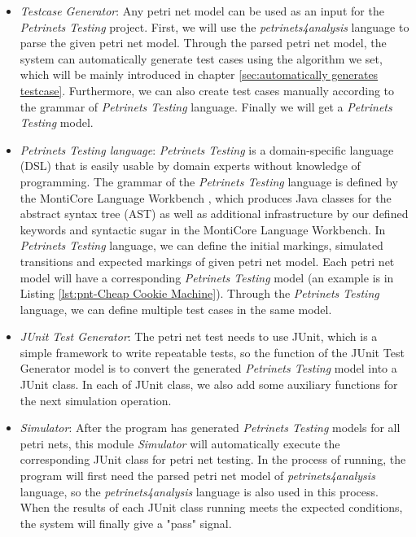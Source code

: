 \begin{itemize}
    \item \emph{Testcase Generator}: Any petri net model can be used as an input for the \emph{Petrinets Testing} project. First, we will use the \emph{petrinets4analysis} language to parse the given petri net model. Through the parsed petri net model, the system can automatically generate test cases using the algorithm we set, which will be mainly introduced in chapter \ref{sec:automatically generates testcase}. Furthermore, we can also create test cases manually according to the grammar of \emph{Petrinets Testing} language. Finally we will get a \emph{Petrinets Testing} model. \\
    
    \item \emph{Petrinets Testing language}: \emph{Petrinets Testing} is a domain-specific language (DSL) that is easily usable by domain experts without knowledge of programming. The grammar of the \emph{Petrinets Testing} language is defined by the MontiCore Language Workbench \cite{rumpe2017monticore}, which produces Java classes for the abstract syntax tree (AST) as well as additional infrastructure by our defined keywords and syntactic sugar in the MontiCore Language Workbench. In \emph{Petrinets Testing} language, we can define the initial markings, simulated transitions and expected markings of given petri net model. Each petri net model will have a corresponding \emph{Petrinets Testing} model (an example is in Listing \ref{lst:pnt-Cheap Cookie Machine}). Through the \emph{Petrinets Testing} language, we can define multiple test cases in the same model. \\
    
    \item \emph{JUnit Test Generator}: The petri net test needs to use JUnit, which is a simple framework to write repeatable tests, so the function of the {JUnit Test Generator} model is to convert the generated \emph{Petrinets Testing} model into a JUnit class. In each of JUnit class, we also add some auxiliary functions for the next simulation operation. \\
    
    \item \emph{Simulator}: After the program has generated \emph{Petrinets Testing} models for all petri nets, this module \emph{Simulator} will automatically execute the corresponding JUnit class for petri net testing. In the process of running, the program will first need the parsed petri net model of \emph{petrinets4analysis} language, so the \emph{petrinets4analysis} language is also used in this process. When the results of each JUnit class running meets the expected conditions, the system will finally give a "pass" signal.
\end{itemize}